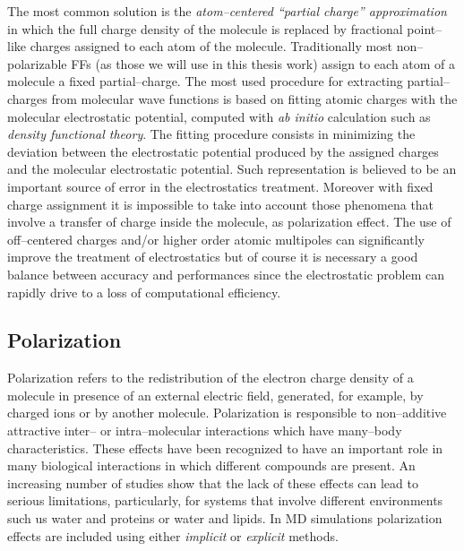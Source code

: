 The most common solution is the \textit{atom--centered ``partial charge'' approximation} in which the full charge
density of the molecule is replaced by fractional point--like charges assigned to each atom of the molecule.
Traditionally most non--polarizable \acp{FF} (as those we will use in this thesis work) assign to each atom of a
molecule a fixed partial--charge. The most used procedure for extracting partial--charges from molecular wave
functions is based on fitting atomic charges with the molecular electrostatic potential, computed with \textit{ab
initio} calculation such as \textit{density functional theory}. The fitting procedure consists in minimizing the
deviation between the electrostatic potential produced by the assigned charges and the molecular electrostatic
potential. Such representation is believed to be an important source of error in the electrostatics treatment.
Moreover with fixed charge assignment it is impossible to take into account those phenomena that involve a
transfer of charge inside the molecule, as polarization effect. The use of off--centered charges and/or higher
order atomic multipoles can significantly improve the treatment of electrostatics but of course it is necessary a
good balance between accuracy and performances since the electrostatic problem can rapidly drive to a loss of
computational efficiency.

\subsection{Polarization}
\label{sec:polarization}
Polarization refers to the redistribution of the electron charge density of a molecule in presence of an external
electric field, generated, for example, by charged ions or by another molecule. Polarization is responsible to
non--additive attractive inter-- or intra--molecular interactions which have many--body characteristics. These
effects have been recognized to have an important role in many biological interactions in which different
compounds are present. An increasing number of studies show that the lack of these effects can lead to serious
limitations, particularly, for systems that involve different environments such us water and proteins or water
and lipids. In \ac{MD} simulations polarization effects are included using either \textit{implicit} or
\textit{explicit} methods.

